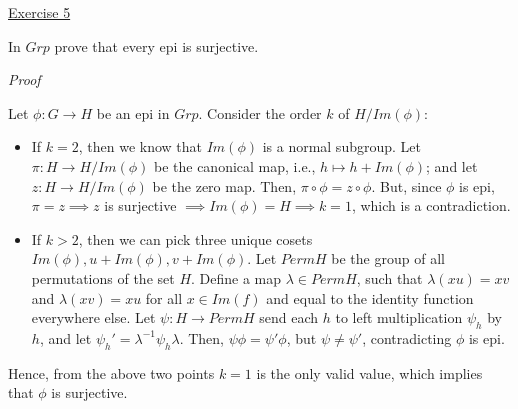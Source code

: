\noindent
\underline{Exercise 5}
\vspace{2mm}

In $Grp$ prove that every epi is surjective.

\vspace{2mm}

\noindent
\emph{Proof}

Let $\phi : G \to H$ be an epi in $Grp$. Consider the order $k$ of $H / Im(\phi)$:

\begin{itemize}
	\item If $k = 2$, then we know that $Im(\phi)$ is a normal subgroup. Let $\pi : H \to H / Im(\phi)$ be the canonical map, i.e., $h \mapsto h + Im(\phi)$; and let $z : H \to H / Im(\phi)$ be the zero map. Then, $\pi \circ \phi = z \circ \phi$. But, since $\phi$ is epi, $\pi = z \implies z$ is surjective $\implies Im(\phi) = H \implies k = 1$, which is a contradiction.
	\item If $k > 2$, then we can pick three unique cosets $Im(\phi), u + Im(\phi), v + Im(\phi)$. Let $Perm H$ be the group of all permutations of the set $H$. Define a map $\lambda \in Perm H$, such that $\lambda (xu) = xv$ and $\lambda (xv) = xu$ for all $x \in Im(f)$ and equal to the identity function everywhere else. Let $\psi: H \to Perm H$ send each $h$ to left multiplication $\psi_h$ by $h$, and let $\psi_{h}' = \lambda^{-1} \psi_h \lambda$. Then, $\psi \phi = \psi' \phi$, but $\psi \neq \psi'$, contradicting $\phi$ is epi.
\end{itemize}

Hence, from the above two points $k = 1$ is the only valid value, which implies that $\phi$ is surjective.

\vspace{2mm}
